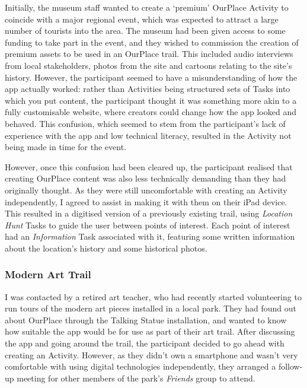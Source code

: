Initially, the museum staff wanted to create a `premium' OurPlace Activity to coincide with a major regional event, which was expected to attract a large number of tourists into the area. The museum had been given access to some funding to take part in the event, and they wished to commission the creation of premium assets to be used in an OurPlace trail. This included audio interviews from local stakeholders, photos from the site and cartoons relating to the site's history. However, the participant seemed to have a misunderstanding of how the app actually worked: rather than Activities being structured sets of Tasks into which you put content, the participant thought it was something more akin to a fully customisable website, where creators could change how the app looked and behaved. This confusion, which seemed to stem from the participant's lack of experience with the app and low technical literacy, resulted in the Activity not being made in time for the event.

However, once this confusion had been cleared up, the participant realised that creating OurPlace content was also less technically demanding than they had originally thought. As they were still uncomfortable with creating an Activity independently, I agreed to assist in making it with them on their iPad device. This resulted in a digitised version of a previously existing trail, using \textit{Location Hunt} Tasks to guide the user between points of interest. Each point of interest had an \textit{Information} Task associated with it, featuring some written information about the location's history and some historical photos.

\subsubsection{Modern Art Trail}

I was contacted by a retired art teacher, who had recently started volunteering to run tours of the modern art pieces installed in a local park. They had found out about OurPlace through the Talking Statue installation, and wanted to know how suitable the app would be for use as part of their art trail. After discussing the app and going around the trail, the participant decided to go ahead with creating an Activity. However, as they didn't own a smartphone and wasn't very comfortable with using digital technologies independently, they arranged a follow-up meeting for other members of the park's \textit{Friends} group to attend.

